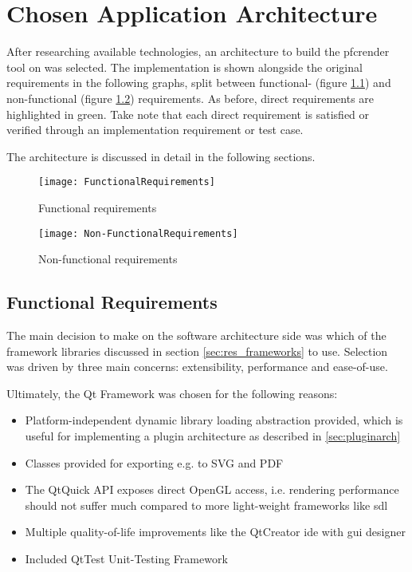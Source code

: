 \chapter{Chosen Application Architecture}

After researching available technologies, an architecture to build the pfcrender tool on was selected. The implementation is shown alongside the original requirements in the following graphs, split between functional- (figure \ref{fr}) and non-functional (figure \ref{nfr}) requirements. As before, direct requirements are highlighted in green. Take note that each direct requirement is satisfied or verified through an implementation requirement or test case.

The architecture is discussed in detail in the following sections.

\begin{figure}[p]
	\texttt{[image: FunctionalRequirements]}
	\caption{Functional requirements}
	\label{fr}
\end{figure}

\begin{figure}[p]
	\texttt{[image: Non-FunctionalRequirements]}
	\caption{Non-functional requirements}
	\label{nfr}
\end{figure}

\section{Functional Requirements}
The main decision to make on the software architecture side was which of the framework libraries discussed in section \ref{sec:res_frameworks} to use.
Selection was driven by three main concerns: extensibility, performance and ease-of-use.

Ultimately, the Qt Framework was chosen for the following reasons:
\begin{itemize}
	\item Platform-independent dynamic library loading abstraction provided, which is useful for implementing a plugin architecture as described in \ref{sec:pluginarch}
	\item Classes provided for exporting e.g. to SVG and PDF
	\item The QtQuick API exposes direct OpenGL access, i.e. rendering performance should not suffer much compared to more light-weight frameworks like \gls{sdl}
	\item Multiple quality-of-life improvements like the QtCreator \gls{ide} with \gls{gui} designer
	\item Included QtTest Unit-Testing Framework
\end{itemize}

